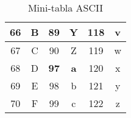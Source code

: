 \documentclass[10pt,twocolumn]{article}
\begin{document}
\begin{table}[h!]
\begin{tabular}{|cc|cc|cc|}
  66          & B          & 89         & Y            & 118 & v               \\ \hline
  67          & C          & 90         & Z            & 119 & w               \\ \hline
  68          & D          & \textbf{97}& \textbf{a}   & 120 & x               \\ \hline
  69          & E          & 98         & b            & 121 & y               \\ \hline
  70          & F          & 99         & c            & 122 & z               \\ \hline
  \end{tabular}
  \caption{Mini-tabla ASCII }
  \label{tab:ascii}
\end{table}
\end{document}
